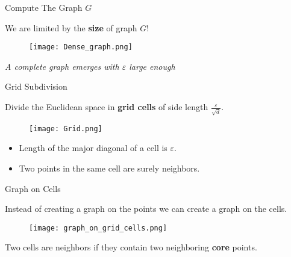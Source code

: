 \documentclass[aspectratio=169]{beamer}
\renewcommand{\epsilon}{\varepsilon}
\begin{document}
\begin{frame}{Compute The Graph $G$}

    \centering We are limited by the \textbf{size} of graph $G$!

    \vspace{0.3cm}
    
    \begin{figure}
        \centering
        \texttt{[image: Dense\_graph.png]}
    \end{figure}
    \begin{center}
        \textit{A complete graph emerges with $\epsilon$ large enough}
    \end{center}
    
\end{frame}

\begin{frame}{Grid Subdivision}

    Divide the Euclidean space in \textbf{grid cells} of side length $\frac{\epsilon}{\sqrt{d}}$.
    
\vspace{0.3cm}

    \begin{minipage}[c]{0.45\textwidth}
        \begin{figure}
            \centering
            \texttt{[image: Grid.png]}
        \end{figure}
    \end{minipage}
    \begin{minipage}[c]{0.50\textwidth}
        \begin{itemize}
       \item Length of the major diagonal of a cell is $\epsilon$. \\
    
        \item Two points in the same cell are surely neighbors.
        \end{itemize}
    \end{minipage}

    
\end{frame}

\begin{frame}{Graph on Cells}

    Instead of creating a graph on the points we can create a graph on the cells.

\vspace{0.3cm}

    \begin{minipage}[c]{0.45\textwidth}
        \begin{figure}
        \centering
        \texttt{[image: graph\_on\_grid\_cells.png]}
    \end{figure}
    \end{minipage}
    \begin{minipage}[c]{0.50\textwidth}
        Two cells are neighbors if they contain two neighboring \textbf{core} points.
    \end{minipage}

    

    
    
\end{frame}
\end{document}
